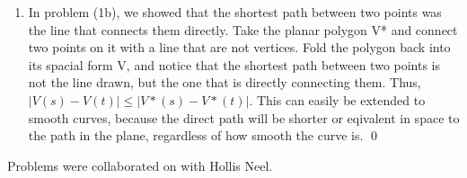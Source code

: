 \documentclass{article}
\begin{document}
\begin{enumerate}
\begin{enumerate}
\item In problem (1b), we showed that the shortest path between two points was the line that connects them directly.
Take the planar polygon V* and connect two points on it with a line that are not vertices. 
Fold the polygon back into its spacial form V, and notice that the shortest path between two points is not the line drawn, but the one that is directly connecting them.
Thus, $|V(s)-V(t)| \leq |V*(s) - V*(t)|$. 
This can easily be extended to smooth curves, because the direct path will be shorter or eqivalent in space to the path in the plane, regardless of how smooth the curve is. \qed

\end{enumerate}

\end{enumerate}

Problems were collaborated on with Hollis Neel.
\end{document}
